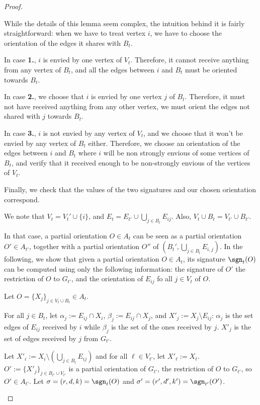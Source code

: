 \documentclass[11pt,letterpaper]{article}
\begin{document}
\begin{proof}
\begin{lemma}
    \end{lemma}

    While the details of this lemma seem complex, the intuition behind it is fairly straightforward: when we have to treat vertex $i$, we have to choose the orientation of the edges it shares with $B_t$.

    In case \textbf{1.}, $i$ is envied by one vertex of $V_t$. Therefore, it cannot receive anything from any vertex of $B_t$, and all the edges between $i$ and $B_t$ must be oriented towards $B_t$.

    In case \textbf{2.}, we choose that $i$ is envied by one vertex $j$ of $B_t$. Therefore, it must not have received anything from any other vertex, we must orient the edges not shared with $j$ towards $B_t$.

    In case \textbf{3.}, $i$ is not envied by any vertex of $V_t$, and we choose that it won't be envied by any vertex of $B_t$ either. Therefore, we choose an orientation of the edges between $i$ and $B_t$ where $i$ will be non strongly envious of some vertices of $B_t$, and verify that it received enough to be non-strongly envious of the vertices of $V_t$.

    Finally, we check that the values of the two signatures and our chosen orientation correspond.

    \begin{nestedproof}
        We note that $V_t=V_t'\cup \{i\}$, and $E_t=E_{t'}\cup \bigcup_{j\in B_t} E_{ij}$. Also, $V_t\cup B_t=V_{t'}\cup B_{t'}$.

        In that case, a partial orientation $O\in A_t$ can be seen as a partial orientation $O'\in A_{t'}$, together with a partial orientation $O''$ of $(B_t',\bigcup_{j\in B_t} E_{i,j})$. In the following, we show that given a partial orientation $O\in A_t$, its signature $\sgn_t(O)$ can be computed using only the following information: the signature of $O'$ the restriction of $O$ to $G_{t'}$, and the orientation of $E_{ij}$ fo all $j\in V_t$ of $O$.

        Let $O=\{X_j\}_{j\in V_t\cup B_t}\in A_t$.

        For all $j\in B_t$, let $\alpha_j:=E_{ij}\cap X_i$, $\beta_j:=E_{ij}\cap X_j$, and $X'_j:=X_j\setminus E_{ij}$: $\alpha_j$ is the set edges of $E_{ij}$ received by $i$ while $\beta_j$ is the set of the ones received by $j$. $X'_j$ is the set of edges received by $j$ from $G_{t'}$.

        Let $X'_i:=X_i\setminus (\bigcup_{j\in B_t}E_{ij})$ and for all $\ell\in V_{t'}$, let $X'_\ell:=X_\ell$.  $O':= \{X'_j\}_{j\in B_{t'}\cup V_{t'}}$ is a partial orientation of $G_{t'}$, the restriction of $O$ to $G_{t'}$, so $O'\in A_{t'}$. Let $\sigma=(r,d,k)=\sgn_t(O)$ and $\sigma'=(r',d',k')=\sgn_{t'}(O')$.


\end{nestedproof}
\end{proof}
\end{document}
